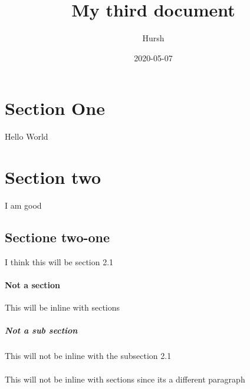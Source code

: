 \documentclass{article}
\title{My third document}
\date{2020-05-07}
\author{Hursh}
\begin{document}
\maketitle
{}
\newpage
{}
\section{Section One}
Hello World
\section {Section two}
I am good
\subsection{Sectione two-one}
I think this will be section 2.1
\paragraph{Not a section}
This will be inline with sections
\subparagraph{ Not a sub section}
This will not be inline with the subsection 2.1
\paragraph{}
This will not be inline with sections since its a different paragraph
\end{document}
